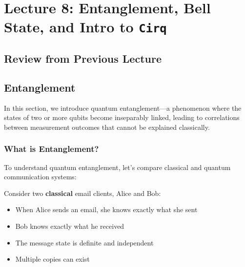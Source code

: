 \section{Lecture 8: Entanglement, Bell State, and Intro to \texttt{Cirq}}
\label{sec:lecture8}

\subsection*{Review from Previous Lecture}




\subsection*{Entanglement}

In this section, we introduce quantum entanglement—a phenomenon where the
states of two or more qubits become inseparably linked, leading to
correlations between measurement outcomes that cannot be explained classically.

\subsubsection*{What is Entanglement?}

To understand quantum entanglement, let's compare classical and quantum
communication systems:

\vspace{0.3cm}

\noindent
Consider two \textbf{classical} email clients, Alice and
Bob:

\begin{itemize}
  \item When Alice sends an email, she knows exactly what she sent
  \item Bob knows exactly what he received
  \item The message state is definite and independent
  \item Multiple copies can exist
\end{itemize}

